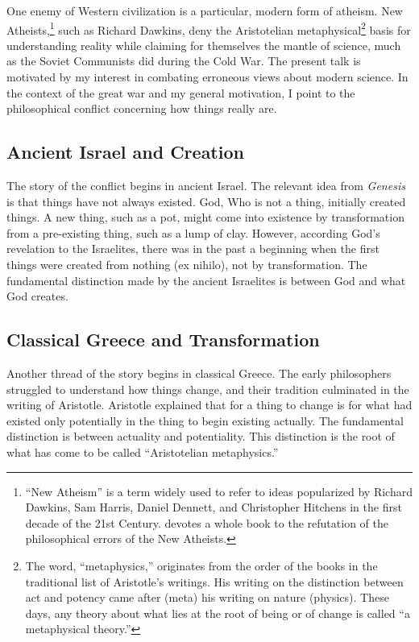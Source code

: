 \documentclass[twocolumn]{article}
\begin{document}
One enemy of Western civilization is a particular, modern form of atheism.  New
Atheists,\footnote{%
   ``New Atheism'' is a term widely used to refer to ideas popularized by
   Richard Dawkins, Sam Harris, Daniel Dennett, and Christopher Hitchens in the
   first decade of the 21st Century.  \cite{f2008} devotes a whole book to the
   refutation of the philosophical errors of the New Atheists.
}
such as Richard Dawkins, deny the Aristotelian metaphysical\footnote{%
   The word, ``metaphysics,'' originates from the order of the books in the
   traditional list of Aristotle's writings.  His writing on the distinction
   between act and potency came after (meta) his writing on nature (physics).
   These days, any theory about what lies at the root of being or of change is
   called ``a metaphysical theory.''%
}
basis for understanding reality while claiming for themselves the mantle of
science, much as the Soviet Communists did during the Cold War.  The present
talk is motivated by my interest in combating erroneous views about modern
science.  In the context of the great war and my general motivation, I point to
the philosophical conflict concerning how things really are.

\subsection{Ancient Israel and Creation}

The story of the conflict begins in ancient Israel.  The relevant idea from
{\it Genesis} is that things have not always existed.  God, Who is not a thing,
initially created things.  A new thing, such as a pot, might come into
existence by transformation from a pre-existing thing, such as a lump of clay.
However, according God's revelation to the Israelites, there was in the past a
beginning when the first things were created from nothing (ex nihilo), not by
transformation.  The fundamental distinction made by the ancient Israelites is
between God and what God creates.

\subsection{Classical Greece and Transformation}

Another thread of the story begins in classical Greece.  The early philosophers
struggled to understand how things change, and their tradition culminated in
the writing of Aristotle.  Aristotle explained that for a thing to change is
for what had existed only potentially in the thing to begin existing actually.
The fundamental distinction is between actuality and potentiality.  This
distinction is the root of what has come to be called ``Aristotelian
metaphysics.''
\end{document}
